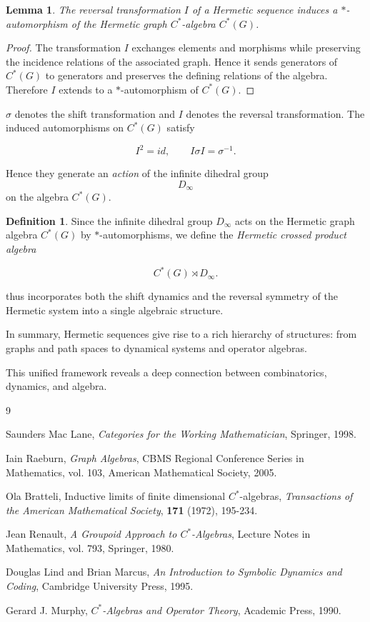 \documentclass[11pt]{book}
\theoremstyle{definition}
\newtheorem{definition}{Definition}[section]
\theoremstyle{plain}
\newtheorem{lemma}[theorem]{Lemma}
\theoremstyle{remark}
\begin{document}
\begin{lemma}
The reversal transformation $I$ of a Hermetic sequence
induces a $*$-automorphism of the Hermetic graph
$C^*$-algebra $C^*(G)$.
\end{lemma}

\begin{proof}
The transformation $I$ exchanges elements and morphisms
while preserving the incidence relations of the associated
graph. Hence it sends generators of $C^*(G)$ to generators
and preserves the defining relations of the algebra.
Therefore $I$ extends to a $*$-automorphism of $C^*(G)$.
\end{proof}

$\sigma$ denotes the shift transformation and
$I$ denotes the reversal transformation.
The induced automorphisms on $C^*(G)$ satisfy

\[
I^2 = id, \qquad I\sigma I = \sigma^{-1}.
\]

Hence they generate an \emph{action} of the infinite
dihedral group
\[
D_\infty
\]
on the algebra $C^*(G)$.

\begin{definition}
Since the infinite dihedral group $D_\infty$
acts on the Hermetic graph algebra $C^*(G)$
by $*$-automorphisms, we define the
\emph{Hermetic crossed product algebra}

\[
C^*(G)\rtimes D_\infty .
\]
\end{definition}

thus incorporates both the shift dynamics and
the reversal symmetry of the Hermetic system
into a single algebraic structure.

In summary, Hermetic sequences give rise to a rich hierarchy of structures:
from graphs and path spaces to dynamical systems and operator algebras.

This unified framework reveals a deep connection
between combinatorics, dynamics, and algebra.




\begin{thebibliography}{9}

Saunders Mac Lane,
\textit{Categories for the Working Mathematician},
Springer, 1998.

Iain Raeburn,
\textit{Graph Algebras},
CBMS Regional Conference Series in Mathematics, vol. 103,
American Mathematical Society, 2005.

Ola Bratteli,
Inductive limits of finite dimensional $C^*$-algebras,
\textit{Transactions of the American Mathematical Society},
\textbf{171} (1972), 195-234.

Jean Renault,
\textit{A Groupoid Approach to $C^*$-Algebras},
Lecture Notes in Mathematics, vol. 793,
Springer, 1980.

Douglas Lind and Brian Marcus,
\textit{An Introduction to Symbolic Dynamics and Coding},
Cambridge University Press, 1995.

Gerard J. Murphy,
\textit{$C^*$-Algebras and Operator Theory},
Academic Press, 1990.

\end{thebibliography}
\end{document}
